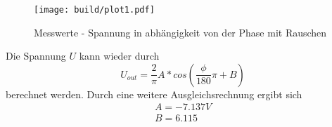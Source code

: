 \begin{figure}
    \centering
    \texttt{[image: build/plot1.pdf]}
    \caption{Messwerte - Spannung in abhängigkeit von der Phase mit Rauschen}        
    \label{fig:plot2}
\end{figure}
Die Spannung $U$ kann wieder durch 
\begin{equation*}
    U_{out} = \frac{2}{\pi} A*cos(\frac{\phi}{180}\pi+B)
\end{equation*}
berechnet werden.
Durch eine weitere Ausgleichsrechnung ergibt sich
\begin{align*}
    A=  -7.137 V\\
    B=  6.115
\end{align*}
